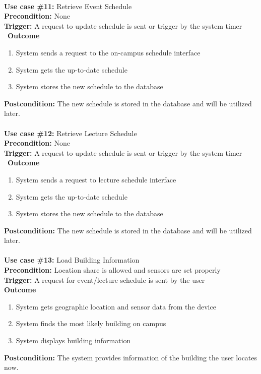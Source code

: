 \documentclass[12pt]{article}
\begin{document}
\noindent\\
\textbf{Use case \#11:} Retrieve Event Schedule\\
\textbf{Precondition:} None\\
\textbf{Trigger:} A request to update schedule is sent or trigger by the system timer\\\
\textbf{Outcome}
\begin{enumerate}
	\item System sends a request to the on-campus schedule interface
    \item System gets the up-to-date schedule
    \item System stores the new schedule to the database
\end{enumerate}
\textbf{Postcondition:} The new schedule is stored in the database and will be utilized later.\\


\noindent\\
\textbf{Use case \#12:} Retrieve Lecture Schedule\\
\textbf{Precondition:} None\\
\textbf{Trigger:} A request to update schedule is sent or trigger by the system timer\\\
\textbf{Outcome}
\begin{enumerate}
	\item System sends a request to lecture schedule interface
    \item System gets the up-to-date schedule
    \item System stores the new schedule to the database
\end{enumerate}
\textbf{Postcondition:} The new schedule is stored in the database and will be utilized later.\\


\noindent\\
\textbf{Use case \#13:} Load Building Information\\
\textbf{Precondition:} Location share is allowed and sensors are set properly\\
\textbf{Trigger:} A request for event/lecture schedule is sent by the user\\
\textbf{Outcome}
\begin{enumerate}
	\item System gets geographic location and sensor data from the device
    \item System finds the most likely building on campus
    \item System displays building information
\end{enumerate}
\textbf{Postcondition:} The system provides information of the building the user locates now.\\
\end{document}
